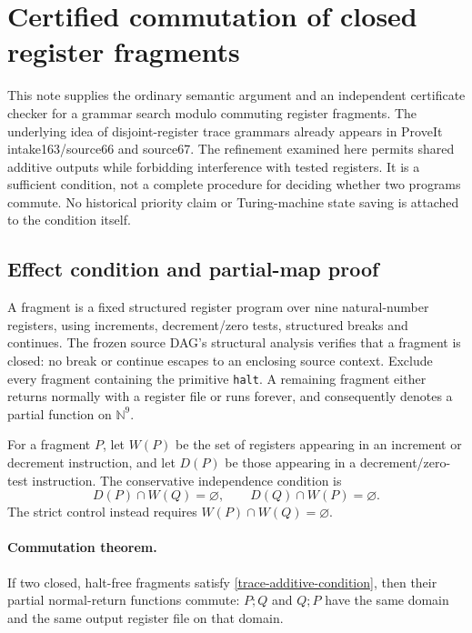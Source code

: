 \section{Certified commutation of closed register fragments}

This note supplies the ordinary semantic argument and an independent
certificate checker for a grammar search modulo commuting register
fragments. The underlying idea of disjoint-register trace grammars already
appears in ProveIt intake163/source66 and source67. The refinement examined
here permits shared additive outputs while forbidding interference with
tested registers. It is a sufficient condition, not a complete procedure
for deciding whether two programs commute. No historical priority claim
or Turing-machine state saving is attached to the condition itself.

\subsection{Effect condition and partial-map proof}

A fragment is a fixed structured register program over nine natural-number
registers, using increments, decrement/zero tests, structured breaks and
continues. The frozen source DAG's structural analysis verifies that a
fragment is closed: no break or continue escapes to an enclosing source
context. Exclude every fragment containing the primitive \texttt{halt}.
A remaining fragment either returns normally with a register file or runs
forever, and consequently denotes a partial function on $\mathbb N^9$.

For a fragment $P$, let $W(P)$ be the set of registers appearing in an
increment or decrement instruction, and let $D(P)$ be those appearing in
a decrement/zero-test instruction. The conservative independence condition
is
\begin{equation}\label{trace-additive-condition}
D(P)\cap W(Q)=\varnothing,
\qquad
D(Q)\cap W(P)=\varnothing.
\end{equation}
The strict control instead requires $W(P)\cap W(Q)=\varnothing$.

\paragraph{Commutation theorem.}
If two closed, halt-free fragments satisfy
\eqref{trace-additive-condition}, then their partial normal-return
functions commute: $P;Q$ and $Q;P$ have the same domain and the same
output register file on that domain.

